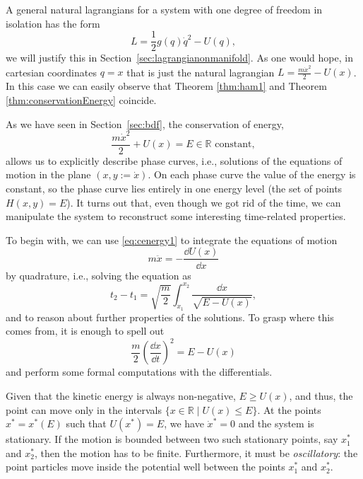 \documentclass[english,fontsize=11pt,paper=b5]{scrbook}
\theoremstyle{definition}
\begin{document}
    A general natural lagrangians for a system with one degree of freedom in isolation has the form
    \begin{equation}
      L = \frac12 g(q)\dot q^2 - U(q),
    \end{equation}
    we will justify this in Section~\ref{sec:lagrangianonmanifold}.
    As one would hope, in cartesian coordinates $q = x$ that is just the natural lagrangian $L = \frac{m \dot x^2}{2} - U(x)$.
    In this case we can easily observe that Theorem \ref{thm:ham1} and Theorem \ref{thm:conservationEnergy} coincide.

    As we have seen in Section~\ref{sec:bdf}, the conservation of energy,
    \begin{equation}\label{eq:cenergy1}
      \frac{m \dot x^2}{2} + U(x) = E \in\mathbb{R} \mbox{ constant},
    \end{equation}
    allows us to explicitly describe phase curves, i.e., solutions of the equations of motion in the plane $(x, y := \dot x)$.
    On each phase curve the value of the energy is constant, so the phase curve lies entirely in one energy level (the set of points $H(x,y)=E$). It turns out that, even though we got rid of the time, we can manipulate the system to reconstruct some interesting time-related properties.

    To begin with, we can use \eqref{eq:cenergy1} to integrate the equations of motion
    \begin{equation}
      m \ddot x = - \frac{\dd U(x)}{\dd x}
    \end{equation}
    by quadrature, i.e., solving the equation as
    \begin{equation}
      t_2 - t_1 = \sqrt{\frac m2} \int_{x_1}^{x_2} \frac{\dd x}{\sqrt{E-U(x)}},
    \end{equation}
    and to reason about further properties of the solutions.
    To grasp where this comes from, it is enough to spell out
    \begin{equation}
      \frac m2 \left(\frac{\dd x}{\dd t}\right)^2 = E - U(x)
    \end{equation}
    and perform some formal computations with the differentials.

    Given that the kinetic energy is always non-negative, $E \geq U(x)$, and thus, the point can move only in the intervals $\{ x\in\mathbb{R} \mid U(x) \leq E\}$. At the points $x^* = x^*(E)$ such that $U(x^*) = E$, we have $\dot x^* = 0$ and the system is stationary. If the motion is bounded between two such stationary points, say $x_1^*$ and $x_2^*$, then the motion has to be finite.
    Furthermore, it must be \emph{oscillatory}: the point particles move inside the potential well between the points $x_1^*$ and $x_2^*$.
\end{document}
